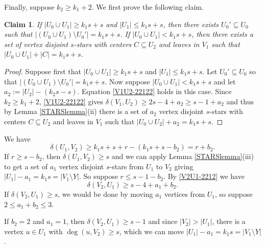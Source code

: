 \documentclass[oneside,12pt]{memoir}
\newtheorem{claim}[theorem]{Claim}
\begin{document}
Finally, suppose $k_2\geq k_1+2$.  We first prove the following claim.

\begin{claim}\label{Claim 22122}
If $|U_0\cup U_1|\geq k_1s+s$ and $|U_1|\leq k_1s+s$, then there exists $U_0'\subseteq U_0$ such that $|(U_0\cup U_1)\setminus U_0'|=k_1s+s$. If $|U_0\cup U_1|< k_1s+s$, then there exists a set of vertex disjoint $s$-stars with centers $C\subseteq U_2$ and leaves in $V_1$ such that $|U_0\cup U_1|+|C|=k_1s+s$.
\end{claim}

\begin{proof}
Suppose first that $|U_0\cup U_1|\geq k_1s+s$ and $|U_1|\leq k_1s+s$.  Let $U_0'\subseteq U_0$ so that $|(U_0\cup U_1)\setminus U_0'|=k_1s+s$.  %
Now suppose $|U_0\cup U_1|< k_1s+s$ and let $a_2:=|U_2|-(k_2s-s)$.  Equation \eqref{V1U2-22122} holds in this case.  Since $k_2\geq k_1+2$, \eqref{V1U2-22122} gives $\delta(V_1, U_2)\geq 2s-4+a_2\geq s-1+a_2$ and thus by Lemma \ref{STARSlemma}(ii) there is a set of $a_2$ vertex disjoint $s$-stars with centers $C\subseteq U_2$ and leaves in $V_1$ such that $|U_0\cup U_2|+a_2=k_1s+s$.
\end{proof}

We have 
\begin{equation}
\delta(U_1, V_2)\geq k_1s+s+r-(k_1s+s-b_2)=r+b_2.\label{221:rb2}
\end{equation}
If $r\geq s-b_2$, then $\delta(U_1, V_2)\geq s$ and we can apply Lemma \ref{STARSlemma}(iii) to get a set of $a_1$ vertex disjoint $s$-stars from $U_1$ to $V_2$ giving $|U_1|-a_1=k_1s=|V_1\setminus Y|$.  So suppose $r\leq s-1-b_2$.  By \eqref{V2U1-2212} we have 
\begin{equation}
\delta(V_2, U_1)\geq s-4+a_1+b_2.\label{221:a1b2}
\end{equation}  
If $\delta(V_2, U_1)\geq s$, we would be done by moving $a_1$ vertices from $U_1$, so suppose $2\leq a_1+b_2\leq 3$.

If $b_2=2$ and $a_1=1$, then $\delta(V_2, U_1)\geq s-1$ and since $|V_2|>|U_1|$, there is a vertex $u\in U_1$ with $\deg(u, V_2)\geq s$, which we can move $|U_1|-a_1=k_1s=|V_1\setminus Y|$.
\end{document}
